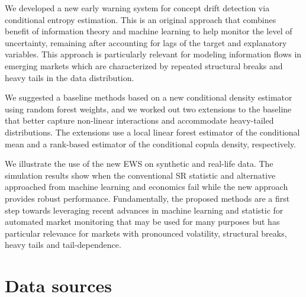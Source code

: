We developed a new early warning system for concept drift detection via conditional entropy estimation. This is an original approach that combines benefit of information theory and machine learning to help monitor the level of uncertainty, remaining after accounting for lags of the target and explanatory variables. This approach is particularly relevant for modeling information flows in emerging markets which are characterized by repeated structural breaks and heavy tails in the data distribution. 

We suggested a baseline methods based on a new conditional density estimator using random forest weights, and we worked out two extensions to the baseline that better capture non-linear interactions and accommodate heavy-tailed distributions. The extensions use a local linear forest estimator of the conditional mean and a rank-based estimator of the conditional copula density, respectively. 

We illustrate the use of the new EWS on synthetic and real-life data. The simulation results show when the conventional SR statistic and alternative approached from machine learning and economics fail while the new approach provides robust performance. Fundamentally, the proposed methods are a first step towards leveraging recent advances in machine learning and statistic for automated market monitoring that may be used for many purposes but has particular relevance for markets with pronounced volatility, structural breaks, heavy tails and tail-dependence. 





\appendix

\section{Data sources}\label{app:sources}

